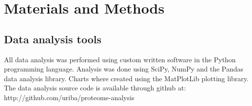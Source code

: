 \section{Materials and Methods}
\subsection{Data analysis tools}
All data analysis was performed using custom written software in the Python programming language.
Analysis was done using SciPy, NumPy and the Pandas data analysis library.
Charts where created using the MatPlotLib plotting library.
The data analysis source code is available through github at: http://github.com/uriba/proteome-analysis